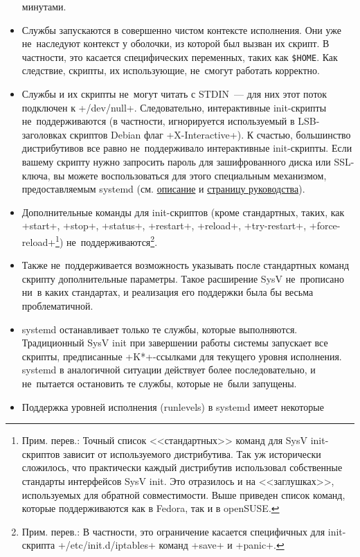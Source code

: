 \documentclass[10pt,oneside,a4paper]{article}
\begin{document}
\begin{itemize}
		минутами.
	\item Службы запускаются в совершенно чистом контексте исполнения.
		Они уже не~наследуют контекст у оболочки, из которой был вызван
		их скрипт. В частности, это касается специфических переменных,
		таких как \verb+$HOME+. Как следствие, скрипты, их использующие,
		не~смогут работать корректно.
	\item Службы и их скрипты не~могут читать с STDIN~--- для них этот поток
		подключен к +/dev/null+. Следовательно, интерактивные
		init-скрипты не~поддерживаются (в частности, игнорируется
		используемый в LSB-заголовках скриптов Debian флаг
		+X-Interactive+). К счастью, большинство дистрибутивов все равно
		не~поддерживало интерактивные init-скрипты. Если вашему скрипту
		нужно запросить пароль для зашифрованного диска или
		SSL-ключа, вы можете воспользоваться для этого специальным
		механизмом, предоставляемым systemd (см.
		\href{http://www.freedesktop.org/wiki/Software/systemd/PasswordAgents}%
		{описание} и
		\href{http://www.freedesktop.org/software/systemd/man/systemd-ask-password.html}%
		{страницу руководства}).
	\item Дополнительные команды для init-скриптов (кроме стандартных,
		таких, как +start+, +stop+, +status+, +restart+, +reload+,
		+try-restart+, +force-reload+\footnote{Прим. перев.: Точный
		список <<стандартных>> команд для SysV init-скриптов зависит от
		используемого дистрибутива. Так уж исторически сложилось, что
		практически каждый дистрибутив использовал собственные стандарты
		интерфейсов SysV init. Это отразилось и на <<заглушках>>,
		используемых для обратной совместимости. Выше приведен список
		команд, которые поддерживаются как в Fedora, так и в openSUSE.})
		не~поддерживаются\footnote{Прим. перев.: В частности, это
		ограничение касается специфичных для init-скрипта
		+/etc/init.d/iptables+ команд +save+ и +panic+.}.
	\item Также не~поддерживается возможность указывать после стандартных
		команд скрипту дополнительные параметры. Такое расширение SysV
		не~прописано ни~в каких стандартах, и реализация его поддержки
		была бы весьма проблематичной.
	\item systemd останавливает только те службы, которые выполняются. 
		Традиционный SysV init при завершении
		работы системы запускает все скрипты, предписанные +K*+-ссылками
		для текущего уровня исполнения. systemd в аналогичной ситуации 
		действует более последовательно, и не~пытается остановить те
		службы, которые не~были запущены.
	\item Поддержка уровней исполнения (runlevels) в systemd имеет некоторые

\end{itemize}
\end{document}

